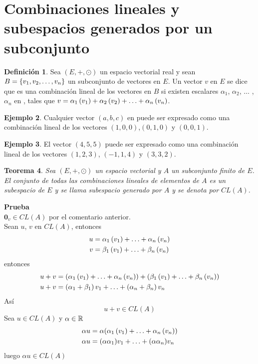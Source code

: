 \documentclass[10pt,a4paper]{amsbook}
\newtheorem{theorem}{Teorema}[chapter]
\theoremstyle{definition}
\newtheorem{dfn}[theorem]{Definición}
\newtheorem{ejemplo}[theorem]{Ejemplo}
\theoremstyle{remark}
\numberwithin{section}{chapter}
\numberwithin{equation}{chapter}
\begin{document}
\section{Combinaciones lineales y subespacios generados por un subconjunto}
\begin{dfn}
Sea $(E, +, \odot)$ un espacio vectorial real y sean $B= \lbrace v_1, v_2, \ldots, v_n \rbrace$ un subconjunto de vectores en $E$. Un vector $v$ en $E$ se dice que es una combinación lineal de los vectores en $B$ si existen escalares $\alpha_1$, $\alpha_2$, $\ldots$ , $\alpha_n$ en \dobler , tales que $v= \alpha_1\left(v_1\right)  +  \alpha_2\left(v_2\right)  + \ldots +  \alpha_n\left(v_n\right) $.

\end{dfn}

\begin{ejemplo}
Cualquier vector $(a, b, c)$ en \rtres puede ser expresado como una combinación lineal de los vectores  $(1,0,0)$,$(0,1,0)$ y $(0,0,1)$.

\end{ejemplo}

\begin{ejemplo}
El vector $(4,5,5)$ puede ser expresado como una combinación lineal de los vectores $(1,2,3)$, $(-1,1,4)$ y $(3,3,2)$.
\end{ejemplo}

\begin{theorem}
Sea $(E, +, \odot)$ un espacio vectorial y $A$ un subconjunto finito de $E$. El conjunto de todas las combinaciones lineales de elementos de $A$ es un subespacio de $E$ y se llama subespacio generado por $A$ y se denota por $CL(A)$.
\end{theorem}

\textbf{Prueba}\\
$\mathbf{0}_v \in CL(A)$ por el comentario anterior.\\
Sean $u$, $v$ en $CL(A)$, entonces
\begin{align*}
u &= \alpha_1\left(v_1\right)  + \ldots +  \alpha_n\left(v_n\right) \\ 
v&= \beta_1\left(v_1\right)  + \ldots +  \beta_n\left(v_n\right) 
\end{align*}
entonces
\begin{align*}
u + v &= ( \alpha_1\left(v_1\right)  + \ldots +  \alpha_n\left(v_n\right) ) + ( \beta_1\left(v_1\right)  + \ldots +  \beta_n\left(v_n\right) )\\
u + v &=(\alpha_1 + \beta_1)\,v_1 + \ldots + (\alpha_n + \beta_n)\, v_n
\end{align*}
Así
$$u + v \in CL(A)$$
Sea $u \in CL(A)$ y $\alpha \in \mathbb{R}$
\begin{align*}
\alpha u &= \alpha( \alpha_1\left(v_1\right)  + \ldots +  \alpha_n\left(v_n\right) )\\
\alpha u &= (\alpha \alpha_1)v_1 + \ldots + (\alpha \alpha_n)v_n
\end{align*}
luego $\alpha u \in CL(A)$\\
\end{document}
